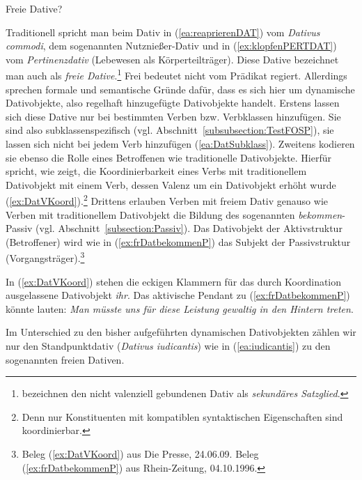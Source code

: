 \begin{Exkurs}{Freie Dative?}\label{Exkurs:freie Dative}
    
Traditionell spricht man beim Dativ in (\ref{ea:reaprierenDAT}) vom \textit{Dativus commodi}, dem sogenannten Nutznießer-Dativ und in (\ref{ex:klopfenPERTDAT}) vom \textit{Pertinenzdativ} (Lebewesen als Körperteilträger). Diese Dative bezeichnet man auch als \textit{freie Dative}.\footnote{\citet[263--265]{HelbigBuscha} bezeichnen den nicht valenziell gebundenen Dativ als \textit{sekundäres Satzglied}.} Frei bedeutet nicht vom Prädikat regiert. Allerdings sprechen formale und semantische Gründe dafür, dass es sich hier um dynamische Dativobjekte, also regelhaft hinzugefügte Dativobjekte handelt. Erstens lassen sich diese Dative nur bei bestimmten Verben bzw. Verbklassen hinzufügen. Sie sind also subklassenspezifisch (vgl. Abschnitt~\ref{subsubsection:TestFOSP}), sie lassen sich nicht bei jedem Verb hinzufügen (\ref{ea:DatSubklass}). Zweitens kodieren sie ebenso die Rolle eines Betroffenen wie traditionelle Dativobjekte. Hierfür spricht, wie \citet[925--926]{MuellerUnifying} zeigt, die Koordinierbarkeit eines Verbs mit traditionellem Dativobjekt mit einem Verb, dessen Valenz um ein Dativobjekt erhöht wurde (\ref{ex:DatVKoord}).\footnote{Denn nur Konstituenten mit kompatiblen syntaktischen Eigenschaften sind koordinierbar.} Drittens erlauben Verben mit freiem Dativ genauso wie Verben mit traditionellem Dativobjekt die Bildung des sogenannten \textit{bekommen}-Passiv (vgl. Abschnitt~\ref{subsection:Passiv}). Das Dativobjekt der Aktivstruktur (Betroffener) wird wie in (\ref{ex:frDatbekommenP}) das Subjekt der Passivstruktur (Vorgangsträger).\footnote{Beleg (\ref{ex:DatVKoord}) aus Die Presse, 24.06.09. Beleg (\ref{ex:frDatbekommenP}) aus Rhein-Zeitung, 04.10.1996.}

\ea \label{ea:freierDativ}
\label{ea:DatSubklass}
\label{ex:DatVKoord}
\label{ex:frDatbekommenP} 
\z 
\z 

In (\ref{ex:DatVKoord}) stehen die eckigen Klammern für das durch Koordination ausgelassene Dativobjekt \textit{ihr}. Das aktivische Pendant zu (\ref{ex:frDatbekommenP}) könnte lauten: \textit{Man müsste uns für diese Leistung gewaltig in den Hintern treten}.  


Im Unterschied zu den bisher aufgeführten dynamischen Dativobjekten zählen wir nur den Standpunktdativ (\textit{Dativus iudicantis}) wie in (\ref{ea:iudicantis}) zu den sogenannten freien Dativen.  


\end{Exkurs}
